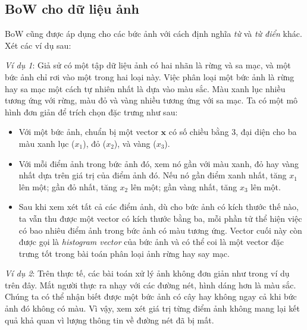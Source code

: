  
  
\subsection{BoW cho dữ liệu ảnh}
BoW cũng được áp dụng cho các bức ảnh với cách định nghĩa \textit{từ} và
\textit{từ điển} khác. Xét các ví dụ sau:
 
\textit{Ví dụ 1}: Giả sử có một tập dữ liệu ảnh có hai nhãn là rừng và sa mạc, và một bức ảnh chỉ rơi vào một trong hai loại này. Việc phân
loại một bức ảnh là rừng hay sa mạc một cách tự nhiên nhất là dựa vào màu sắc.
Màu xanh lục nhiều tương ứng với rừng, màu đỏ và vàng nhiều tương ứng với sa mạc. Ta có một mô hình đơn giản để trích chọn đặc trưng như sau:
\begin{itemize}
    \item Với một bức ảnh, chuẩn bị một vector $\mathbf{x}$ có số chiều bằng 3,
    đại diện cho ba màu xanh lục ($x_1$), đỏ ($x_2$), và vàng ($x_3$).  

    \item Với mỗi điểm ảnh trong bức ảnh đó, xem nó gần với màu xanh, đỏ hay
    vàng nhất dựa trên giá trị của điểm ảnh đó. Nếu nó gần điểm xanh nhất, tăng
    $x_1$ lên một; gần đỏ nhất, tăng $x_2$ lên một; gần vàng nhất, tăng $x_3$
    lên một.

    \item Sau khi xem xét tất cả các điểm ảnh, dù cho bức ảnh có kích thước thế
    nào, ta vẫn thu được một vector có kích thước bằng ba, mỗi phần tử thể hiện
    việc có bao nhiêu điểm ảnh trong bức ảnh có màu tương ứng. Vector cuối này còn
    được gọi là \textit{histogram vector} của bức ảnh và có thể coi là một vector đặc trưng tốt trong bài toán phân loại
    ảnh rừng hay say mạc. 
\end{itemize} 
  
\textit{Ví dụ 2}: Trên thực tế, các bài toán xử lý ảnh không đơn giản như trong
ví dụ trên đây. Mắt người thực ra nhạy với các đường nét, hình dáng hơn là màu
sắc. Chúng ta có thể nhận biết được một bức ảnh có cây hay không ngay cả khi bức
ảnh đó không có màu. Vì vậy, xem xét giá trị từng điểm ảnh không mang lại kết
quả khả quan vì lượng thông tin về đường nét đã bị mất.

